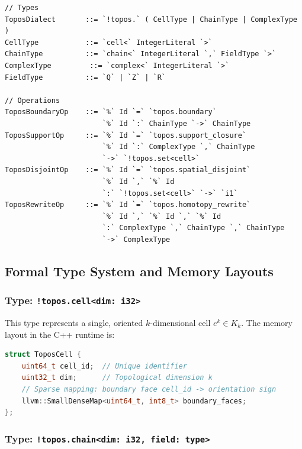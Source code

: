 \documentclass[manuscript, nonacm, review=false]{acmart}
\theoremstyle{definition}
\theoremstyle{plain}
\begin{document}
\begin{lstlisting}[language={}, caption={EBNF Grammar for the \texttt{topos} MLIR Dialect}, label={lst:ebnf}]
// Types
ToposDialect       ::= `!topos.` ( CellType | ChainType | ComplexType )
CellType           ::= `cell<` IntegerLiteral `>`
ChainType          ::= `chain<` IntegerLiteral `,` FieldType `>`
ComplexType         ::= `complex<` IntegerLiteral `>`
FieldType          ::= `Q` | `Z` | `R`

// Operations
ToposBoundaryOp    ::= `%` Id `=` `topos.boundary`
                       `%` Id `:` ChainType `->` ChainType
ToposSupportOp     ::= `%` Id `=` `topos.support_closure`
                       `%` Id `:` ComplexType `,` ChainType
                       `->` `!topos.set<cell>`
ToposDisjointOp    ::= `%` Id `=` `topos.spatial_disjoint`
                       `%` Id `,` `%` Id
                       `:` `!topos.set<cell>` `->` `i1`
ToposRewriteOp     ::= `%` Id `=` `topos.homotopy_rewrite`
                       `%` Id `,` `%` Id `,` `%` Id
                       `:` ComplexType `,` ChainType `,` ChainType
                       `->` ComplexType
\end{lstlisting}


\subsection{Formal Type System and Memory Layouts}
\label{subsec:ir_types}

\subsubsection{Type: \texttt{!topos.cell<dim: i32>}}

This type represents a single, oriented $k$-dimensional cell $e^k \in K_k$. The memory layout in the C++ runtime is:

\begin{lstlisting}[language=C++, caption={Memory layout for \texttt{ToposCell}}, label={lst:cell_layout}]
struct ToposCell {
    uint64_t cell_id;  // Unique identifier
    uint32_t dim;      // Topological dimension k
    // Sparse mapping: boundary face cell_id -> orientation sign
    llvm::SmallDenseMap<uint64_t, int8_t> boundary_faces;
};
\end{lstlisting}

\subsubsection{Type: \texttt{!topos.chain<dim: i32, field: type>}}
\end{document}
